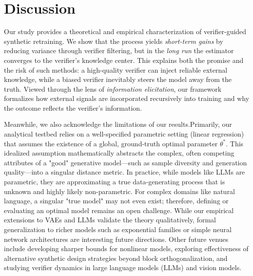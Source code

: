 
\section{Discussion}

Our study provides a theoretical and empirical characterization of verifier-guided synthetic retraining.  
We show that the process yields \emph{short-term gains} by reducing variance through verifier filtering, but in the \emph{long run} the estimator converges to the verifier’s knowledge center.  
This explains both the promise and the risk of such methods: a high-quality verifier can inject reliable external knowledge, while a biased verifier inevitably steers the model away from the truth.  
Viewed through the lens of \emph{information elicitation}, our framework formalizes how external signals are incorporated recursively into training and why the outcome reflects the verifier’s information.  


Meanwhile, we also acknowledge the limitations of our results.Primarily, our analytical testbed relies on a well-specified parametric setting (linear regression) that assumes the existence of a global, ground-truth optimal parameter $\theta^*$.
This idealized assumption mathematically abstracts the complex, often competing attributes of a "good" generative model---such as sample diversity and generation quality---into a singular distance metric.
In practice, while models like LLMs are parametric, they are approximating a true data-generating process that is unknown and highly likely non-parametric.
For complex domains like natural language, a singular "true model" may not even exist; therefore, defining or evaluating an optimal model remains an open challenge.
While our empirical extensions to VAEs and LLMs validate the theory qualitatively, formal generalization to richer models such as exponential families or simple neural network architectures are interesting future directions.
Other future venues include developing sharper bounds for nonlinear models, exploring effectiveness of alternative synthetic design strategies beyond block orthogonalization, and studying verifier dynamics in large language models (LLMs) and vision models.   
